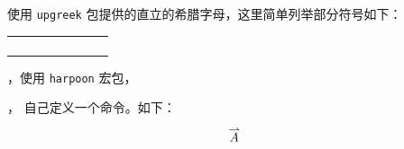 使用 \verb|upgreek| 包提供的直立的希腊字母，这里简单列举部分符号如下：
\begin{center}
	\begin{tabular}{*4{ll}}
		\K{\upalpha}      & \K{\uptheta}      & \K{\uppi}         & \K{\upphi}        \\
		\K{\upbeta}       & \K{\upvartheta}   & \K{\upvarpi}      & \K{\upvarphi}     \\
		\K{\upgamma }     & \K{\upiota}       & \K{\uprho}        & \K{\upchi}        \\
		\K{\updelta}      & \K{\upkappa}      & \K{\upvarrho}     & \K{\uppsi}        \\
	\end{tabular}
\end{center}



，使用 \verb|harpoon| 宏包，
\begin{texlist}
\end{texlist}



，
自己定义一个命令。如下：
\begin{texlist}
\newcommand{\myvec}[1]%
{\stackrel{\raisebox{-2pt}[0pt][0pt]
		{\small$\rightharpoonup$}}{#1}}
\[
	\myvec{A}
\]
\end{texlist}

